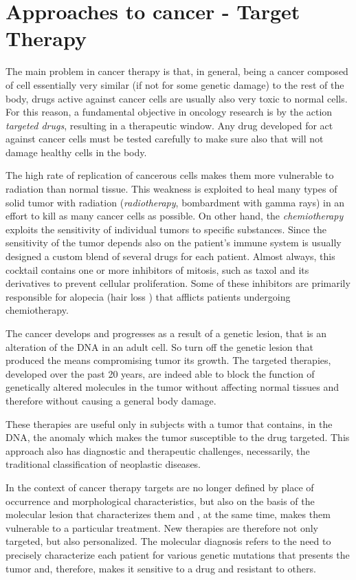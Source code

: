 \section{Approaches to cancer - Target Therapy}

The main problem in cancer therapy is that, in general, being a cancer composed of cell essentially very similar (if not for some genetic damage) to the rest of the body, drugs active against cancer cells are usually also very toxic to normal cells. For this reason, a fundamental objective in oncology research is by the action \textit{targeted drugs}, resulting in a therapeutic window. Any drug developed for act against cancer cells must be tested carefully to make sure also that will not damage healthy cells in the body.

The high rate of replication of cancerous cells makes them more vulnerable to radiation than normal tissue. This weakness is exploited to heal many types of solid tumor with radiation (\textit{radiotherapy}, bombardment with gamma rays) in an effort to kill as many cancer cells as possible. On other hand, the \textit{chemiotherapy} exploits the sensitivity of individual tumors to specific substances. Since the sensitivity of the tumor depends also on the patient's immune system is usually designed a custom blend of several drugs for each patient. Almost always, this cocktail contains one or more inhibitors of mitosis, such as taxol and its derivatives to prevent cellular proliferation. Some of these inhibitors are primarily responsible for alopecia (hair loss ) that afflicts patients undergoing chemiotherapy.

The cancer develops and progresses as a result of a genetic lesion, that is an alteration of the DNA in an adult cell. So turn off the genetic lesion that produced the means compromising tumor its growth. The targeted therapies, developed over the past 20 years, are indeed able to block the function of genetically altered molecules in the tumor without affecting normal tissues and therefore without causing a general body damage.

These therapies are useful only in subjects with a tumor that contains, in the DNA, the anomaly which makes the tumor susceptible to the drug targeted. This approach also has diagnostic and therapeutic challenges, necessarily, the traditional classification of neoplastic diseases.

In the context of cancer therapy targets are no longer defined by place of occurrence and morphological characteristics, but also on the basis of the molecular lesion that characterizes them and , at the same time, makes them vulnerable to a particular treatment. New therapies are therefore not only targeted, but also personalized. The molecular diagnosis refers to the need to precisely characterize each patient for various genetic mutations that presents the tumor and, therefore, makes it sensitive to a drug and resistant to others.


